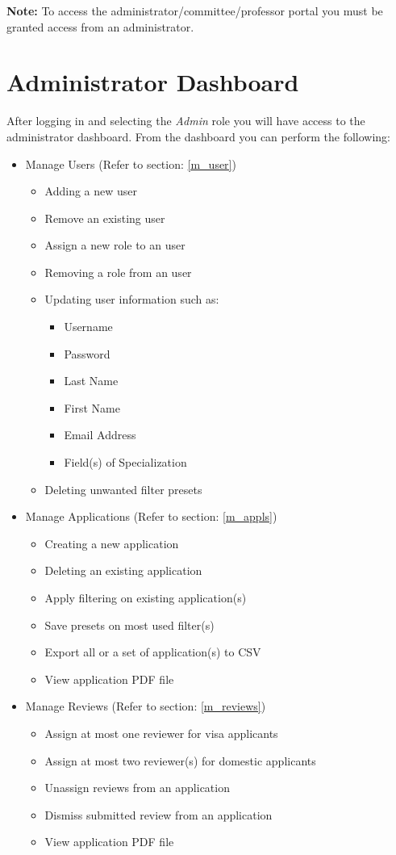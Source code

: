\documentclass[fontsize=12pt,paper=letter,twoside]{scrartcl}
\begin{document}
\noindent \textbf{Note:} To access the administrator/committee/professor portal you must be granted access from an administrator.

\section{Administrator Dashboard}

After logging in and selecting the \emph{Admin} role you will have access to the administrator dashboard. From the dashboard you can perform the following:
\begin{itemize}
\item Manage Users (Refer to section: \ref{m_user})
\begin{itemize}
\item Adding a new user
\item Remove an existing user
\item Assign a new role to an user
\item Removing a role from an user
\item Updating user information such as:
\begin{itemize}
\item Username
\item Password
\item Last Name
\item First Name
\item Email Address
\item Field(s) of Specialization
\end{itemize}
\item Deleting unwanted filter presets
\end{itemize}
\item Manage Applications (Refer to section: \ref{m_appls})
\begin{itemize}
\item Creating a new application
\item Deleting an existing application
\item Apply filtering on existing application(s)
\item Save presets on most used filter(s)
\item Export all or a set of application(s) to CSV
\item View application PDF file
\end{itemize}
\item Manage Reviews (Refer to section: \ref{m_reviews})
\begin{itemize}
\item Assign at most one reviewer for visa applicants
\item Assign at most two reviewer(s) for domestic applicants
\item Unassign reviews from an application
\item Dismiss submitted review from an application
\item View application PDF file
\end{itemize}
\end{itemize} 
\end{document}
